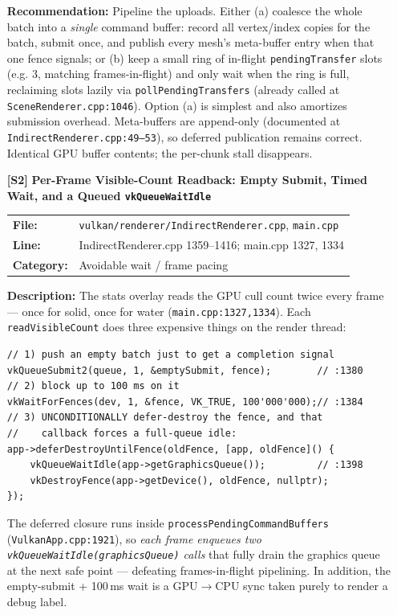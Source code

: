 \documentclass[a4paper,12pt]{article}
\newcommand{\severitybox}[2]{%
  \colorbox{#1}{\makebox[2.5cm][c]{\textcolor{white}{\textbf{#2}}}}%
}
\begin{document}
\begin{enumerate}[leftmargin=*]
  \textbf{Recommendation:}
  Pipeline the uploads. Either (a) coalesce the whole batch into a
  \emph{single} command buffer: record all vertex/index copies for the batch,
  submit once, and publish every mesh's meta-buffer entry when that one fence
  signals; or (b) keep a small ring of in-flight \texttt{pendingTransfer} slots
  (e.g. 3, matching frames-in-flight) and only wait when the ring is full,
  reclaiming slots lazily via \texttt{pollPendingTransfers} (already called at
  \texttt{SceneRenderer.cpp:1046}). Option (a) is simplest and also amortizes
  submission overhead. Meta-buffers are append-only (documented at
  \texttt{IndirectRenderer.cpp:49--53}), so deferred publication remains correct.
  Identical GPU buffer contents; the per-chunk stall disappears.

\item[\textbf{[S2]}] \textbf{Per-Frame Visible-Count Readback: Empty Submit, Timed Wait, and a Queued \texttt{vkQueueWaitIdle}}
  \hfill \severitybox{highcolor}{HIGH}

  \begin{tabular}{ll}
    \textbf{File:} & \texttt{vulkan/renderer/IndirectRenderer.cpp}, \texttt{main.cpp} \\
    \textbf{Line:} & IndirectRenderer.cpp 1359--1416; main.cpp 1327, 1334 \\
    \textbf{Category:} & Avoidable wait / frame pacing \\
  \end{tabular}

  \textbf{Description:}
  The stats overlay reads the GPU cull count twice every frame — once for solid,
  once for water (\texttt{main.cpp:1327,1334}). Each
  \texttt{readVisibleCount} does three expensive things on the render thread:

\begin{lstlisting}
// 1) push an empty batch just to get a completion signal
vkQueueSubmit2(queue, 1, &emptySubmit, fence);        // :1380
// 2) block up to 100 ms on it
vkWaitForFences(dev, 1, &fence, VK_TRUE, 100'000'000);// :1384
// 3) UNCONDITIONALLY defer-destroy the fence, and that
//    callback forces a full-queue idle:
app->deferDestroyUntilFence(oldFence, [app, oldFence]() {
    vkQueueWaitIdle(app->getGraphicsQueue());         // :1398
    vkDestroyFence(app->getDevice(), oldFence, nullptr);
});
\end{lstlisting}

  The deferred closure runs inside \texttt{processPendingCommandBuffers}
  (\texttt{VulkanApp.cpp:1921}), so \emph{each frame enqueues two
  \texttt{vkQueueWaitIdle(graphicsQueue)} calls} that fully drain the graphics
  queue at the next safe point — defeating frames-in-flight pipelining. In
  addition, the empty-submit + 100\,ms wait is a GPU$\rightarrow$CPU sync taken
  purely to render a debug label.


\end{enumerate}
\end{document}
